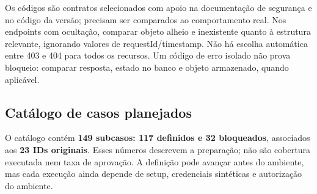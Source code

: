 Os códigos são contratos selecionados com apoio na documentação de
segurança e no código da versão; precisam ser comparados ao
comportamento real. Nos endpoints com ocultação, comparar objeto alheio
e inexistente quanto à estrutura relevante, ignorando valores de
requestId/\allowbreak{}timestamp. Não há escolha automática entre 403 e 404 para
todos os recursos. Um código de erro isolado não prova bloqueio:
comparar resposta, estado no banco e objeto armazenado, quando
aplicável.

\subsection{Catálogo de casos
planejados}\label{catuxe1logo-de-casos-planejados}

O catálogo contém \textbf{149 subcasos: 117 definidos e 32 bloqueados},
associados aos \textbf{23 IDs originais}. Esses números descrevem a
preparação; não são cobertura executada nem taxa de aprovação. A
definição pode avançar antes do ambiente, mas cada execução ainda
depende de setup, credenciais sintéticas e autorização do ambiente.

